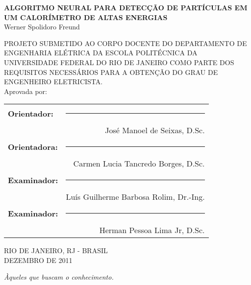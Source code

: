 \begin{titlepage}
	\begin{center}
		{\large \uppercase{\bf{Algoritmo Neural para Detecção de Partículas em um Calorímetro de Altas Energias}}}\\[0.9cm]
    {Werner Spolidoro Freund}\\[0.9cm]
  \end{center}

		{\uppercase{\footnotesize{PROJETO SUBMETIDO AO CORPO DOCENTE DO DEPARTAMENTO 
DE ENGENHARIA ELÉTRICA DA ESCOLA POLITÉCNICA DA UNIVERSIDADE FEDERAL DO RIO 
DE JANEIRO COMO PARTE DOS REQUISITOS NECESSÁRIOS PARA A OBTENÇÃO DO GRAU 
DE ENGENHEIRO ELETRICISTA.}}}\\[0.3cm]

    {Aprovada por:}

  \begin{flushright}
		\begin{tabular}{lr}
			{\bf Orientador:}& \rule{8cm}{0.4pt} \\ 
					 & José Manoel de Seixas, D.Sc. \\[0.5cm]
			{\bf Orientadora:} & \rule{8cm}{0.4pt} \\
					 & Carmen Lucia Tancredo Borges, D.Sc. \\[0.5cm]
			{\bf Examinador:}& \rule{8cm}{0.4pt} \\
					 & Luís Guilherme Barbosa Rolim, Dr.-Ing. \\[0.5cm]
			{\bf Examinador:}& \rule{8cm}{0.4pt} \\
					 & Herman Pessoa Lima Jr, D.Sc. \\[0.5cm]
		\end{tabular}
	\end{flushright}
  \vfill
  \begin{center}
		\begin{large}
      \uppercase{
			RIO DE JANEIRO, RJ - BRASIL \\
      DEZEMBRO DE 2011}
		\end{large}
  \end{center}
\end{titlepage}

\cleardoublepage

\null
\vfill
\begin{flushright}
  \em{Àqueles que buscam o conhecimento.}\\
\end{flushright}
